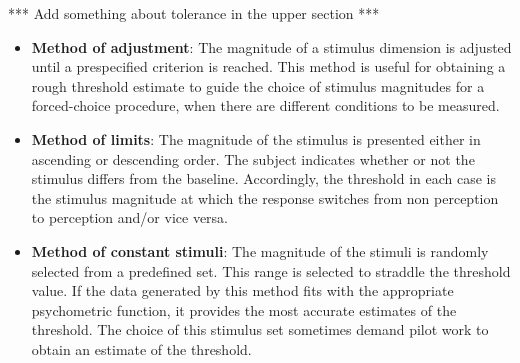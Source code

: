 *** Add something about tolerance in the upper section ***

\begin{itemize}
	\item \textbf{Method of adjustment}: The magnitude of a stimulus dimension is adjusted until a prespecified criterion is reached. This method is useful for obtaining a rough threshold estimate to guide the choice of stimulus magnitudes for a forced-choice procedure, when there are different conditions to be measured. \cite{Kingdom2016}
	\item \textbf{Method of limits}: The magnitude of the stimulus is presented either in ascending or descending order.
	The subject indicates whether or not the stimulus differs from the baseline. Accordingly, the threshold in each case is the stimulus magnitude at which the response switches from non perception to perception and/or vice versa. \cite{Kingdom2016}
	\item \textbf{Method of constant stimuli}: The magnitude of the stimuli is randomly selected from a predefined set. This range is selected to straddle the threshold value. If the data generated by this method fits with the appropriate psychometric function, it provides the most accurate estimates of the threshold. The choice of this stimulus set sometimes demand pilot work to obtain an estimate of the threshold. \cite{Kingdom2016}
\end{itemize}
